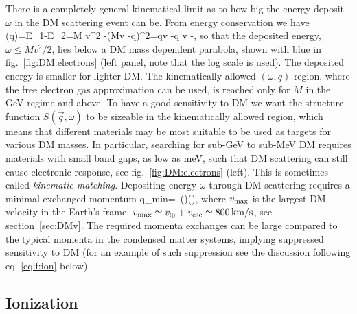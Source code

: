 \smallskip

There is a completely general kinematical limit as to how big the energy deposit $\omega$ in the DM scattering event can be. From energy conservation we have
\beq
\omega(\vec q)=E_1-E_2=M v^2 -\big(M\vec v -\vec q)^2=\vec q\cdot \vec v -\leq q  v -,
\eeq
so that the deposited energy, $\omega \leq M v^2/2$, lies below a DM mass dependent parabola, shown with blue in fig.~\ref{fig:DM:electrons} (left panel, note that the log scale is used). 
The deposited energy is smaller for lighter DM. 
The kinematically allowed $(\omega,  q)$ region, where the free electron gas approximation can be used, is reached only for $M$ in the GeV regime and above. To have a good sensitivity to DM we want the structure function $S(\vec q, \omega)$ 
to be sizeable in the kinematically allowed region, which means that different materials may be most suitable to be used as targets for various DM masses. In particular, searching for sub-GeV to sub-MeV DM requires materials with small band gaps, as low as meV, such that DM scattering can still cause electronic response, see fig.~\ref{fig:DM:electrons} (left). 
This is sometimes called {\em kinematic matching}. Depositing  energy $\omega$ through DM scattering requires a minimal exchanged momentum
\beq
\label{eq:qmin}
q_{\rm min}=\,  \biggr(\biggr)\biggr(\biggr),
\eeq
where $v_{\rm max}$ is the largest DM velocity in the Earth's frame, $v_{\rm max}\simeq v_\oplus+v_{\rm esc}\simeq 800\,\text{km/s}$, see section~\ref{sec:DMv}. The required momenta exchanges can be large compared to the typical momenta in the condensed matter systems, implying suppressed sensitivity to DM (for an example of such suppression see the discussion following eq. \eqref{eq:f:ion} below). 

\medskip

\subsection{Ionization}

